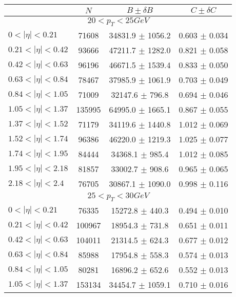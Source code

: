 \begin{tabular}{lccc}
\hline
    &   $N$   & $B \pm \delta B$  &  $C \pm \delta C$ \\
\hline
\hline
\multicolumn{4}{c}{$20 < p_{T} < 25 GeV$} \\
\hline
$0 < |\eta| <0.21$             & 71608      & 34831.9    $\pm$ 1056.2 & 0.603      $\pm$ 0.034 \\
$0.21 < |\eta| <0.42$          & 93666      & 47211.7    $\pm$ 1282.0 & 0.821      $\pm$ 0.058 \\
$0.42 < |\eta| <0.63$          & 96196      & 46671.5    $\pm$ 1539.4 & 0.833      $\pm$ 0.050 \\
$0.63 < |\eta| <0.84$          & 78467      & 37985.9    $\pm$ 1061.9 & 0.703      $\pm$ 0.049 \\
$0.84 < |\eta| <1.05$          & 71009      & 32147.6    $\pm$ 796.8 & 0.694      $\pm$ 0.046 \\
$1.05 < |\eta| <1.37$          & 135995     & 64995.0    $\pm$ 1665.1 & 0.867      $\pm$ 0.055 \\
$1.37 < |\eta| <1.52$          & 71179      & 34119.6    $\pm$ 1440.8 & 1.012      $\pm$ 0.069 \\
$1.52 < |\eta| <1.74$          & 96386      & 46220.0    $\pm$ 1219.3 & 1.025      $\pm$ 0.077 \\
$1.74 < |\eta| <1.95$          & 84444      & 34368.1    $\pm$ 985.4 & 1.012      $\pm$ 0.085 \\
$1.95 < |\eta| <2.18$          & 81857      & 33002.7    $\pm$ 908.6 & 0.965      $\pm$ 0.065 \\
$2.18 < |\eta| <2.4$           & 76705      & 30867.1    $\pm$ 1090.0 & 0.998      $\pm$ 0.116 \\
\hline
\multicolumn{4}{c}{$25 < p_{T} < 30 GeV$} \\
\hline
$0 < |\eta| <0.21$             & 76335      & 15272.8    $\pm$ 440.3 & 0.494      $\pm$ 0.010 \\
$0.21 < |\eta| <0.42$          & 100967     & 18954.3    $\pm$ 731.8 & 0.651      $\pm$ 0.011 \\
$0.42 < |\eta| <0.63$          & 104011     & 21314.5    $\pm$ 624.3 & 0.677      $\pm$ 0.012 \\
$0.63 < |\eta| <0.84$          & 85988      & 17954.8    $\pm$ 558.3 & 0.574      $\pm$ 0.013 \\
$0.84 < |\eta| <1.05$          & 80281      & 16896.2    $\pm$ 652.6 & 0.552      $\pm$ 0.013 \\
$1.05 < |\eta| <1.37$          & 153134     & 34454.7    $\pm$ 1059.1 & 0.710      $\pm$ 0.016 \\

\end{tabular}
